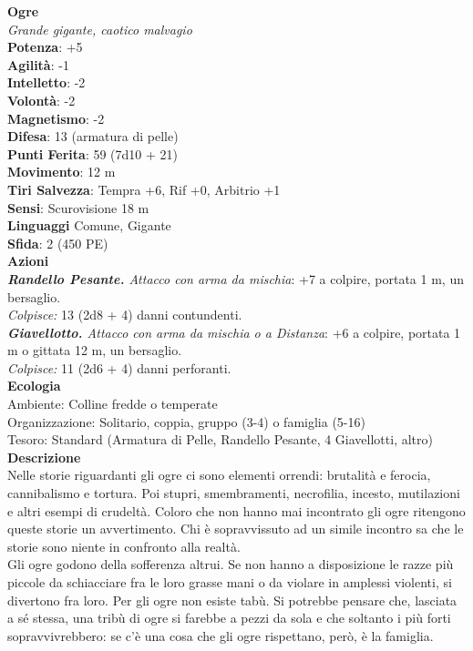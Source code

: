 \begin{multicols}{2}
\medskip\textbf{Ogre}\\
\emph{Grande gigante, caotico malvagio}\\
\textbf{Potenza}: +5\\
\textbf{Agilità}: -1\\
\textbf{Intelletto}: -2\\
\textbf{Volontà}: -2\\
\textbf{Magnetismo}: -2\\
\textbf{Difesa}: 13 (armatura di pelle)\\
\textbf{Punti Ferita}: 59 (7d10 + 21)\\
\textbf{Movimento}: 12 m\\
\textbf{Tiri Salvezza}: Tempra +6, Rif +0, Arbitrio +1\\
\textbf{Sensi}: Scurovisione 18 m\\
\textbf{Linguaggi} Comune, Gigante\\
\textbf{Sfida}: 2 (450 PE)\smallskip\\
\smallskip\textbf{Azioni}\\
\emph{\textbf{Randello Pesante.} Attacco con arma da mischia}: +7 a colpire, portata 1 m, un bersaglio.\\
\emph{Colpisce:} 13 (2d8 + 4) danni contundenti.\\
\emph{\textbf{Giavellotto.} Attacco con arma da mischia o a Distanza}: +6 a colpire, portata 1 m o gittata 12 m, un bersaglio.\\
\emph{Colpisce:} 11 (2d6 + 4) danni perforanti.\\
\textbf{Ecologia}\\
Ambiente: Colline fredde o temperate\\
Organizzazione: Solitario, coppia, gruppo (3-4) o famiglia (5-16)\\
Tesoro: Standard (Armatura di Pelle, Randello Pesante, 4 Giavellotti, altro)\\
\textbf{Descrizione}\\
Nelle storie riguardanti gli ogre ci sono elementi orrendi: brutalità e ferocia, cannibalismo e tortura. Poi stupri, smembramenti, necrofilia, incesto, mutilazioni e altri esempi di crudeltà. Coloro che non hanno mai incontrato gli ogre ritengono queste storie un avvertimento. Chi è sopravvissuto ad un simile incontro sa che le storie sono niente in confronto alla realtà.\\

Gli ogre godono della sofferenza altrui. Se non hanno a disposizione le razze più piccole da schiacciare fra le loro grasse mani o da violare in amplessi violenti, si divertono fra loro. Per gli ogre non esiste tabù. Si potrebbe pensare che, lasciata a sé stessa, una tribù di ogre si farebbe a pezzi da sola e che soltanto i più forti sopravvivrebbero: se c’è una cosa che gli ogre rispettano, però, è la famiglia.\\


\end{multicols}
